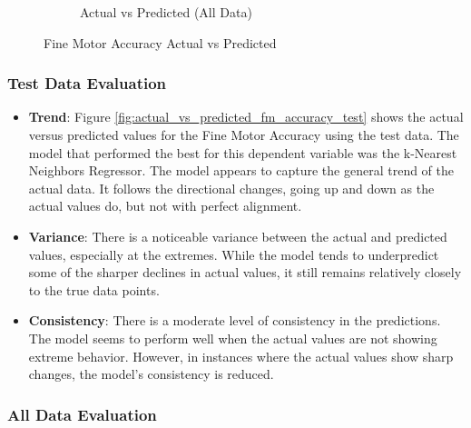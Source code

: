 \begin{figure}[htbp]
\begin{subfigure}[b]{0.49\textwidth}
        \caption{Actual vs Predicted (All Data)}
        \label{fig:actual_vs_predicted_fm_accuracy_all_data}
    \end{subfigure}
    \caption{Fine Motor Accuracy Actual vs Predicted}
    \label{fig:fine_motor_accuracy_comparison}
\end{figure}

\subsubsection*{Test Data Evaluation}

\begin{itemize}
    \item \textbf{Trend}: Figure \ref{fig:actual_vs_predicted_fm_accuracy_test} shows the actual versus predicted values for the Fine Motor Accuracy using the test data. The model 
    that performed the best for this dependent variable was the k-Nearest Neighbors Regressor. The model appears to capture the general trend of the actual data. It follows the directional
    changes, going up and down as the actual values do, but not with perfect alignment.
    \item \textbf{Variance}: There is a noticeable variance between the actual and predicted values, especially at the extremes. While the model tends to underpredict some of the sharper
    declines in actual values, it still remains relatively closely to the true data points.
    \item \textbf{Consistency}: There is a moderate level of consistency in the predictions. The model seems to perform well when the actual values are not showing extreme behavior. However,
    in instances where the actual values show sharp changes, the model's consistency is reduced.
\end{itemize}

\subsubsection*{All Data Evaluation}

